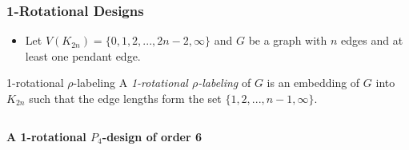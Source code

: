 \documentclass[11pt,serif,professionalfont,aspectratio=169]{beamer}
\newcommand{\vertex}{\node[vertex]}
\theoremstyle{plain}
\begin{document}
\begin{frame}
\frametitle{1-Rotational Designs}
\begin{itemize}
\item Let $V(K_{2n})=\{0,1,2,...,2n-2,\infty\}$
and $G$ be a graph with $n$ edges and at least one pendant edge.
\end{itemize}
\pause
\begin{block}{1-rotational $\rho$-labeling}
A \emph{1-rotational $\rho$-labeling} of $G$ is an embedding of $G$ into $K_{2n}$ such that the edge lengths form the set $\{1,2,...,n-1,\infty\}.$
\end{block}
\pause
\begin{columns}[T] %
\begin{column}{.48\textwidth}
\textbf{A 1-rotational $P_{4}$-design of order 6}
\end{column}%
\hfill%
\begin{column}{.48\textwidth}
\begin{center}

\end{center}
\end{column}%
\end{columns}

\end{frame}
\end{document}
